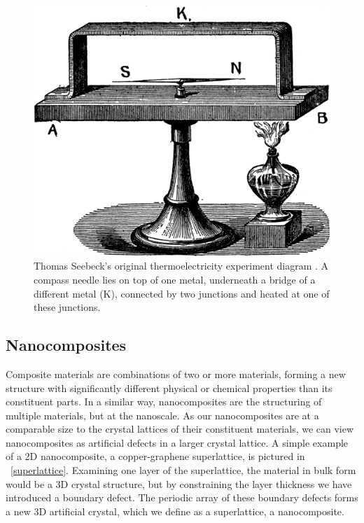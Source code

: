\documentclass[12pt,titlepage,draft]{article}
\newcommand{\figref}[2][\figurename~]{#1\ref{#2}}
\begin{document}
\begin{figure}
	\centering
	\includegraphics{seebeck-experiment-black.png}
	\caption{Thomas Seebeck's original thermoelectricity experiment
	diagram \cite{seebeck-original}. A compass needle lies on top of
	one metal, underneath a bridge of a different metal (K), connected
	by two junctions and heated at one of these junctions.}
	\label{seebeck-experiment}
\end{figure}

\subsection{Nanocomposites}
Composite materials are combinations of two or more materials, forming a new structure with significantly different physical or chemical properties than its constituent parts. In a similar way, nanocomposites are the structuring of multiple materials, but at the nanoscale. As our nanocomposites are at a comparable size to the crystal lattices of their constituent materials, we can view nanocomposites as artificial defects in a larger crystal lattice. A simple example of a 2D nanocomposite, a copper-graphene superlattice, is pictured in \figref{superlattice}. Examining one layer of the superlattice, the material in bulk form would be a 3D crystal structure, but by constraining the layer thickness we have introduced a boundary defect. The periodic array of these boundary defects forms a new 3D artificial crystal, which we define as a superlattice, a nanocomposite.
\end{document}
